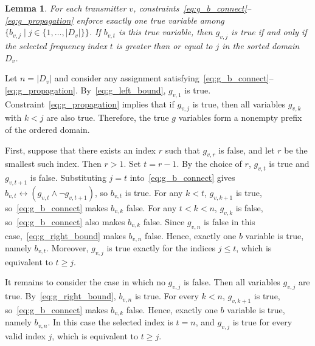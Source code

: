 \documentclass[letterpaper,journal]{IEEEtran}
\newtheorem{lemma}{Lemma}
\begin{document}
\begin{lemma}
\label{lem:order_variable_semantics}
For each transmitter $v$, constraints~\eqref{eq:g_b_connect}--\eqref{eq:g_propagation} enforce exactly one true variable among $\{b_{v,j}\mid j\in\{1,\ldots,|D_v|\}\}$. If $b_{v,t}$ is this true variable, then $g_{v,j}$ is true if and only if the selected frequency index $t$ is greater than or equal to $j$ in the sorted domain $D_v$.
\end{lemma}
\begin{IEEEproof}
Let $n=|D_v|$ and consider any assignment satisfying~\eqref{eq:g_b_connect}--\eqref{eq:g_propagation}. By~\eqref{eq:g_left_bound}, $g_{v,1}$ is true. Constraint~\eqref{eq:g_propagation} implies that if $g_{v,j}$ is true, then all variables $g_{v,k}$ with $k<j$ are also true. Therefore, the true $g$ variables form a nonempty prefix of the ordered domain.

First, suppose that there exists an index $r$ such that $g_{v,r}$ is false, and let $r$ be the smallest such index. Then $r>1$. Set $t=r-1$. By the choice of $r$, $g_{v,t}$ is true and $g_{v,t+1}$ is false. Substituting $j=t$ into~\eqref{eq:g_b_connect} gives $b_{v,t}\leftrightarrow(g_{v,t}\wedge\neg g_{v,t+1})$, so $b_{v,t}$ is true.
For any $k<t$, $g_{v,k+1}$ is true, so~\eqref{eq:g_b_connect} makes $b_{v,k}$ false. For any $t<k<n$, $g_{v,k}$ is false, so~\eqref{eq:g_b_connect} also makes $b_{v,k}$ false. Since $g_{v,n}$ is false in this case,~\eqref{eq:g_right_bound} makes $b_{v,n}$ false. Hence, exactly one $b$ variable is true, namely $b_{v,t}$. Moreover, $g_{v,j}$ is true exactly for the indices $j\le t$, which is equivalent to $t\ge j$.

It remains to consider the case in which no $g_{v,j}$ is false. Then all variables $g_{v,j}$ are true. By~\eqref{eq:g_right_bound}, $b_{v,n}$ is true. For every $k<n$, $g_{v,k+1}$ is true, so~\eqref{eq:g_b_connect} makes $b_{v,k}$ false. Hence, exactly one $b$ variable is true, namely $b_{v,n}$. In this case the selected index is $t=n$, and $g_{v,j}$ is true for every valid index $j$, which is equivalent to $t\ge j$.
\end{IEEEproof}
\end{document}
